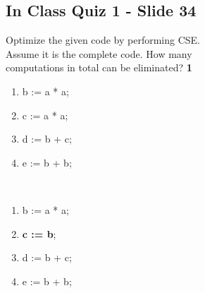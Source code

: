 \documentclass{report}
\begin{document}
\subsection{In Class Quiz 1 - Slide 34}
\vspace{-1em}
\begin{multicols}{2}
Optimize the given code by performing CSE. \\
Assume it is the complete code. How many \\
computations in total can be eliminated? \textbf{1}
\vspace{-1em}
  \begin{multicols}{3}
    \begin{enumerate}
      \item b := a * a;
      \item c := a * a;
      \item d := b + c;
      \item e := b + b;
    \end{enumerate}
\vfill\columnbreak
 \ \\
\vfill\columnbreak
    \begin{enumerate}
      \item b := a * a;
      \item \textbf{c := b};
      \item d := b + c;
      \item e := b + b;
    \end{enumerate}
  \end{multicols}
\end{multicols}


\vspace{-2em}
\end{document}
